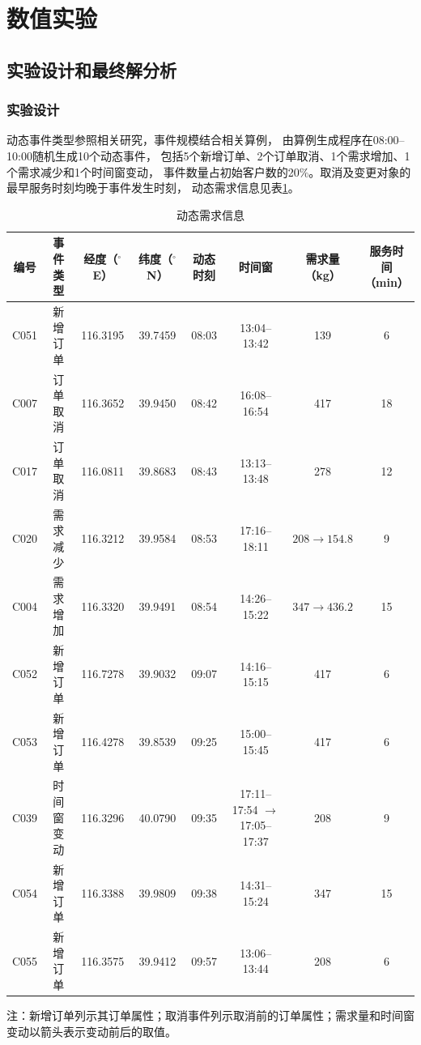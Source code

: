 \documentclass{setp-new}
\begin{document}
\section{数值实验}

\subsection{实验设计和最终解分析}

\subsubsection{实验设计}

动态事件类型参照相关研究\cite{ref:71}，事件规模结合相关算例\cite{ref:51}，
由算例生成程序在08:00--10:00随机生成10个动态事件，
包括5个新增订单、2个订单取消、1个需求增加、1个需求减少和1个时间窗变动，
事件数量占初始客户数的20\%。取消及变更对象的最早服务时刻均晚于事件发生时刻，
动态需求信息见表\ref{tab:dynamic-nodes}。

\begin{table}[H]
\centering
\caption{动态需求信息}
\label{tab:dynamic-nodes}
\small
\renewcommand{\arraystretch}{0.90}
\setlength{\tabcolsep}{1.0pt}
\begin{tabular*}{\textwidth}{@{\extracolsep{\fill}}cccccccc@{}}
\toprule
编号 & 事件类型 & 经度（$^{\circ}$E） & 纬度（$^{\circ}$N） & 动态时刻 & 时间窗 & \makecell{需求量\\（kg）} & \makecell{服务时间\\（min）}\\
\midrule
C051 & 新增订单 & 116.3195 & 39.7459 & 08:03 & 13:04--13:42 & 139 & 6\\
C007 & 订单取消 & 116.3652 & 39.9450 & 08:42 & 16:08--16:54 & 417 & 18\\
C017 & 订单取消 & 116.0811 & 39.8683 & 08:43 & 13:13--13:48 & 278 & 12\\
C020 & 需求减少 & 116.3212 & 39.9584 & 08:53 & 17:16--18:11 & $208\rightarrow154.8$ & 9\\
C004 & 需求增加 & 116.3320 & 39.9491 & 08:54 & 14:26--15:22 & $347\rightarrow436.2$ & 15\\
C052 & 新增订单 & 116.7278 & 39.9032 & 09:07 & 14:16--15:15 & 417 & 6\\
C053 & 新增订单 & 116.4278 & 39.8539 & 09:25 & 15:00--15:45 & 417 & 6\\
C039 & 时间窗变动 & 116.3296 & 40.0790 & 09:35 & \makecell{17:11--17:54\\$\rightarrow$17:05--17:37} & 208 & 9\\
C054 & 新增订单 & 116.3388 & 39.9809 & 09:38 & 14:31--15:24 & 347 & 15\\
C055 & 新增订单 & 116.3575 & 39.9412 & 09:57 & 13:06--13:44 & 208 & 6\\
\bottomrule
\end{tabular*}
\vspace{2pt}
\parbox{\textwidth}{\footnotesize 注：新增订单列示其订单属性；取消事件列示取消前的订单属性；需求量和时间窗变动以箭头表示变动前后的取值。}
\end{table}
\end{document}
